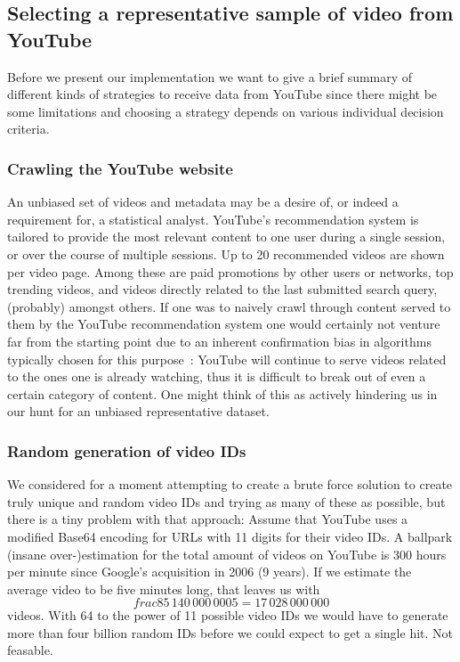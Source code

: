 \subsection{Selecting a representative sample of video from YouTube}


Before we present our implementation we want to give a brief summary of
different kinds of strategies to receive data from YouTube since there might be
some limitations and choosing a strategy depends on various individual decision
criteria.

\subsubsection{Crawling the YouTube website}
An unbiased set of videos and metadata may be a desire of, or indeed a
requirement for, a statistical analyst. YouTube's recommendation system is
tailored to provide the most relevant content to one user during a single
session, or over the course of multiple sessions. Up to 20 recommended videos are shown per video page. Among these are paid
promotions by other users or networks, top trending videos, and videos directly related to the last
submitted search query, (probably) amongst others. If one was to naively crawl
through content served to them by the YouTube recommendation system one would
certainly not venture far from the starting point due to an inherent
confirmation bias in algorithms typically chosen for this
purpose~\cite{youtube-recommendation-system}: YouTube will
continue to serve videos related to the ones one is already watching, thus it is
difficult to break out of even a certain category of content. One might think of
this as actively hindering us in our hunt for an unbiased representative dataset.

\subsubsection{Random generation of video IDs}
We considered for a moment attempting to create a brute force solution to
create truly unique and random video IDs and trying as many of these as
possible, but there is a tiny problem with that approach:
Assume that YouTube uses a modified Base64 encoding for URLs with 11 digits
for their video IDs. A ballpark (insane over-)estimation for the total amount of videos on
YouTube is 300 hours per minute since Google's acquisition in 2006 (9 years).
If we estimate the average video to be five minutes long, that leaves us with
\[frac{85\,140\,000\,000}{5} = 17\,028\,000\,000\] videos. With 64 to the power
of 11 possible video IDs we would have to generate more than four billion random
IDs before we could expect to get a single hit. Not feasable.

